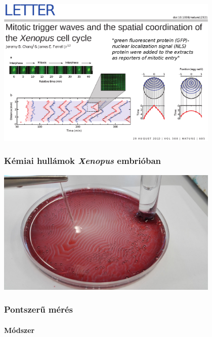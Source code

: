 \documentclass{beamer}
\begin{document}
\begin{frame}
	\centering
	\includegraphics[width=0.8\textwidth]{chang.eps}
	\frametitle{Kémiai hullámok \emph{Xenopus} embrióban}
\end{frame}

\begin{frame}
	\centering
	\includegraphics[width=0.8\textwidth]{setup1.jpg}
	\frametitle{Pontszerű mérés}
	\framesubtitle{Módszer}
\end{frame}
\end{document}
